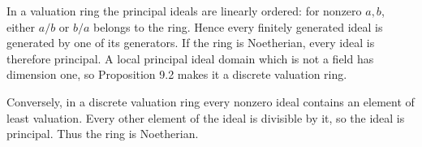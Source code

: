 In a valuation ring the principal ideals are linearly ordered: for nonzero $a,b$, either $a/b$ or $b/a$ belongs to the ring. Hence every finitely generated ideal is generated by one of its generators. If the ring is Noetherian, every ideal is therefore principal. A local principal ideal domain which is not a field has dimension one, so Proposition 9.2 makes it a discrete valuation ring.

Conversely, in a discrete valuation ring every nonzero ideal contains an element of least valuation. Every other element of the ideal is divisible by it, so the ideal is principal. Thus the ring is Noetherian.
